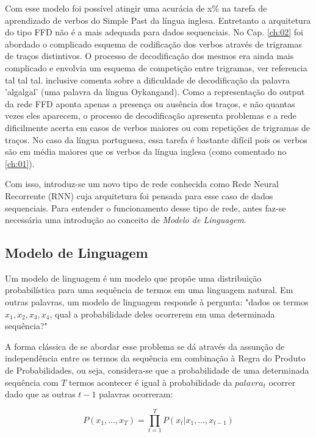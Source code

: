 Com esse modelo foi possível atingir uma acurácia de x\% na tarefa de aprendizado de verbos do Simple Past da língua inglesa. Entretanto a arquitetura do tipo FFD não é a mais adequada para dados sequenciais. No Cap. \ref{ch:02} foi abordado o complicado esquema de codificação dos verbos através de trigramas de traços distintivos. O processo de decodificação dos mesmos era ainda mais complicado e envolvia um esquema de competição entre trigramas, ver referencia tal tal tal. \cite{Pinker:1999} inclusive comenta sobre a dificuldade de decodificação da palavra 'algalgal' (uma palavra da língua Oykangand). Como a representação do output da rede FFD aponta apenas a presença ou ausência dos traços, e não quantas vezes eles aparecem, o processo de decodificação apresenta problemas e a rede dificilmente acerta em casos de verbos maiores ou com repetições de trigramas de traços. No caso da língua portuguesa, essa tarefa é bastante difícil pois os verbos são em média maiores que os verbos da língua inglesa (como comentado no \ref{ch:01}). 

Com isso, introduz-se um novo tipo de rede conhecida como Rede Neural Recorrente (RNN) cuja arquitetura foi pensada para esse caso de dados sequenciais. Para entender o funcionamento desse tipo de rede, antes faz-se necessária uma introdução ao conceito de \textit{Modelo de Linguagem}.

\subsection{Modelo de Linguagem}

Um modelo de linguagem é um modelo que propõe uma distribuição probabilística para uma sequência de termos em uma linguagem natural. Em outras palavras, um modelo de linguagem responde à pergunta: "dados os termos $x_1,x_2,x_3,x_4$, qual a probabilidade deles ocorrerem em uma determinada sequência?"

A forma clássica de se abordar esse problema se dá através da assunção de independência entre os termos da sequência em combinação à Regra do Produto de Probabilidades, ou seja, considera-se que a probabilidade de uma determinada sequência com $T$ termos acontecer é igual à probabilidade da $palavra_{t}$ ocorrer dado que as outras $t-1$ palavras ocorreram:

\begin{equation}
P(x_1, \dots, x_T) = \prod_{t=1}^{T} P(x_t \vert x_1, \dots, x_{t-1}) 
\end{equation}

